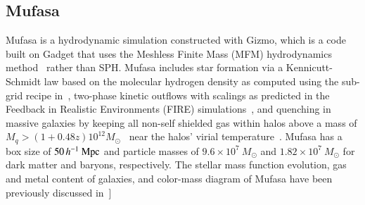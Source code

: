 \documentclass[preprint2,tighten]{aastex62}
\begin{document}
\subsection{{\sc Mufasa}} \label{sec:mufasa}
{\sc Mufasa} is a hydrodynamic simulation constructed with {\sc Gizmo}, which 
is a code built on {\sc Gadget} that uses the Meshless Finite Mass (MFM) 
hydrodynamics method~\citep{hopkins2015a} rather than SPH.  %
{\sc Mufasa} includes star formation via a Kennicutt-Schmidt law based on the 
molecular hydrogen density as computed using the sub-grid recipe in~\citep{krumholz2011}, 
two-phase kinetic outflows with scalings as predicted in the Feedback in 
Realistic Environments (FIRE) simulations~\citep{muratov2015}, and quenching 
in massive galaxies by keeping all non-self shielded gas within halos above 
a mass of $M_q>(1+0.48z)10^{12}M_\odot$~\citep{mitra2015} near the halos' 
virial temperature~\citep{gabor2015}. {\sc Mufasa} has a box size of 
$50\,h^{-1}\ {\rm Mpc}$ and particle masses of $9.6 \times 10^7\ M_{\odot}$ 
and $1.82 \times 10^7\ M_{\odot}$ for dark matter and baryons, respectively. 
The stellar mass function evolution, gas and metal content of galaxies, and 
color-mass diagram of {\sc Mufasa} have been previously discussed in~\citet{dave2016,dave2017,dave2017b}]
\end{document}
